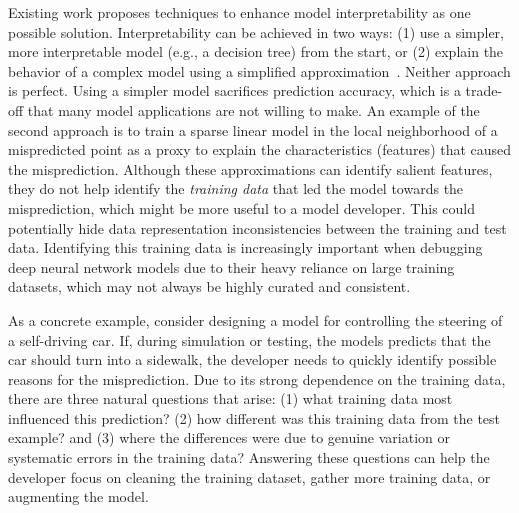 Existing work proposes techniques to enhance model interpretability as one possible solution.
Interpretability can be achieved in two ways: (1) use a simpler, more interpretable model (e.g., a decision tree) from the start, or (2) explain the behavior of a complex model using a simplified approximation~\cite{taylor2016alignment, lei2016rationalizing, ribeiro2016should}. Neither approach is perfect. 
Using a simpler model sacrifices prediction accuracy, which is a trade-off that many model applications are not willing to make.
An example of the second approach is to train a sparse linear model in the local neighborhood of a mispredicted point as a proxy to explain the characteristics (features) that caused the misprediction\cite{taylor2016alignment, lei2016rationalizing, ribeiro2016should}.
Although these approximations can identify salient features, they do not help identify the {\it training data} that led the model towards the misprediction, which might be more useful to a model developer.
This could potentially hide data representation inconsistencies between the training and test data.
Identifying this training data is increasingly important when debugging deep neural network models due to their heavy reliance on large training datasets, which may not always be highly curated and consistent.


As a concrete example, consider designing a model for controlling the steering of a self-driving car.
If, during simulation or testing, the models predicts that the car should turn into a sidewalk, the developer needs to quickly identify possible reasons for the misprediction.
Due to its strong dependence on the training data, there are three natural questions that arise:
(1) what training data most influenced this prediction? (2) how different was this training data from the test example? and (3) where the differences were due to genuine variation or systematic errors in the training data?
Answering these questions can help the developer focus on cleaning the training dataset, gather more training data, or augmenting the model.

